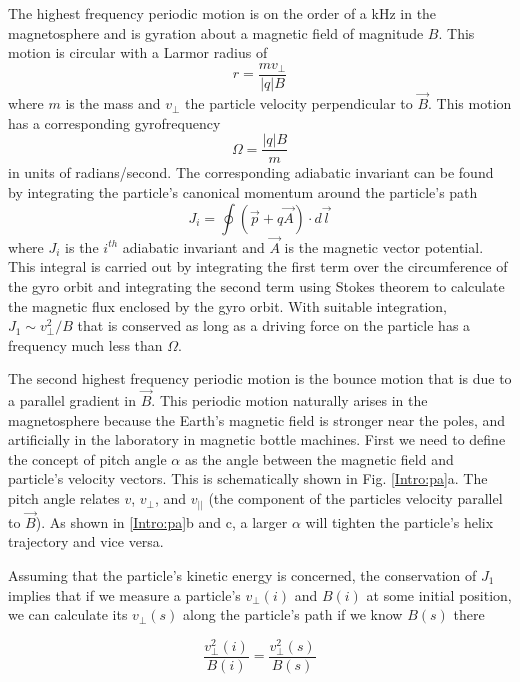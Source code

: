 The highest frequency periodic motion is on the order of a kHz in the magnetosphere and is gyration about a magnetic field of magnitude $B$. This motion is circular with a Larmor radius of 
\begin{equation}
r = \frac{m v_\perp}{|q| B}
\end{equation} where $m$ is the mass and $v_\perp$ the particle velocity perpendicular to $\vec{B}$. This motion has a corresponding gyrofrequency 
\begin{equation}
\Omega = \frac{|q| B}{m}
\end{equation} in units of radians/second. The corresponding adiabatic invariant can be found by integrating the particle's canonical momentum around the particle's path
\begin{equation}
J_i = \oint (\vec{p} + q \vec{A}) \cdot d\vec{l}
\end{equation} where $J_i$ is the $i^{th}$ adiabatic invariant and $\vec{A}$ is the magnetic vector potential. This integral is carried out by integrating the first term over the circumference of the gyro orbit and integrating the second term using Stokes theorem to calculate the magnetic flux enclosed by the gyro orbit.  With suitable integration, $J_1 \sim v_\perp^2 / B$ that is conserved as long as a driving force on the particle has a frequency much less than $\Omega$.

The second highest frequency periodic motion is the bounce motion that is due to a parallel gradient in $\vec{B}$. This periodic motion naturally arises in the magnetosphere because the Earth's magnetic field is stronger near the poles, and artificially in the laboratory in magnetic bottle machines. First we need to define the concept of pitch angle $\alpha$ as the angle between the magnetic field and particle's velocity vectors. This is schematically shown in Fig. \ref{Intro:pa}a. The pitch angle relates $v$, $v_\perp$, and $v_{||}$ (the component of the particles velocity parallel to $\vec{B}$). As shown in \ref{Intro:pa}b and c, a larger $\alpha$ will tighten the particle's helix trajectory and vice versa.

Assuming that the particle's kinetic energy is concerned, the conservation of $J_1$ implies that if we measure a particle's $v_\perp(i)$ and $B(i)$ at some initial position, we can calculate its $v_\perp(s)$ along the particle's path if we know $B(s)$ there

\begin{equation}
\frac{v_\perp^2 (i)}{B(i)} = \frac{v_\perp^2 (s)}{B(s)}
\end{equation} 

